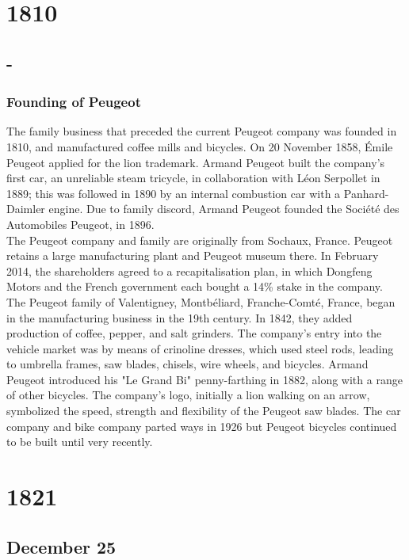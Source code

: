 \documentclass[11pt]{report}
\begin{document}
\chapter{1810}
\section{-}
\subsection{Founding of Peugeot}
The family business that preceded the current Peugeot company was founded in 1810, and manufactured coffee mills and bicycles. On 20 November 1858, Émile Peugeot applied for the lion trademark. Armand Peugeot built the company's first car, an unreliable steam tricycle, in collaboration with Léon Serpollet in 1889; this was followed in 1890 by an internal combustion car with a Panhard-Daimler engine. Due to family discord, Armand Peugeot founded the Société des Automobiles Peugeot, in 1896.\\
\indent The Peugeot company and family are originally from Sochaux, France. Peugeot retains a large manufacturing plant and Peugeot museum there. In February 2014, the shareholders agreed to a recapitalisation plan, in which Dongfeng Motors and the French government each bought a 14\% stake in the company.\\ \indent The Peugeot family of Valentigney, Montbéliard, Franche-Comté, France, began in the manufacturing business in the 19th century. In 1842, they added production of coffee, pepper, and salt grinders. The company's entry into the vehicle market was by means of crinoline dresses, which used steel rods, leading to umbrella frames, saw blades, chisels, wire wheels, and bicycles. Armand Peugeot introduced his "Le Grand Bi" penny-farthing in 1882, along with a range of other bicycles. The company's logo, initially a lion walking on an arrow, symbolized the speed, strength and flexibility of the Peugeot saw blades. The car company and bike company parted ways in 1926 but Peugeot bicycles continued to be built until very recently.

\chapter{1821}
\section{December 25}
\end{document}
